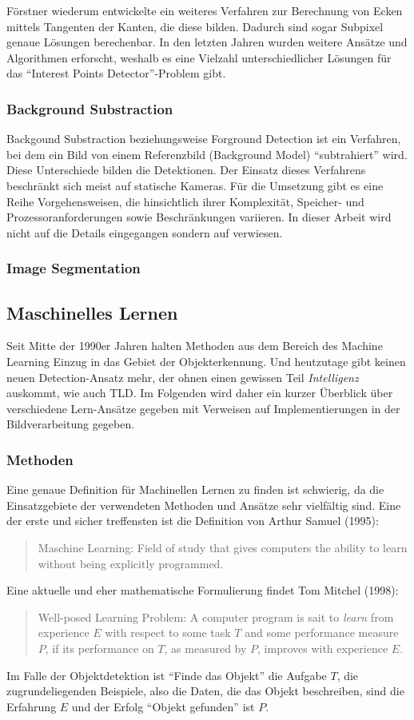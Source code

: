 Förstner \cite{FOD} wiederum entwickelte ein weiteres Verfahren zur Berechnung von Ecken mittels Tangenten der Kanten, die diese bilden. Dadurch sind sogar Subpixel genaue Lösungen berechenbar. In den letzten Jahren wurden weitere Ansätze und Algorithmen erforscht, weshalb es eine Vielzahl unterschiedlicher Lösungen für das ``Interest Points Detector''-Problem gibt.

\subsubsection{Background Substraction}
Backgound Substraction beziehungsweise Forground Detection ist ein Verfahren, bei dem ein Bild von einem Referenzbild (Background Model) ``subtrahiert'' wird. Diese Unterschiede bilden die Detektionen. Der Einsatz dieses Verfahrens beschränkt sich meist auf statische Kameras. Für die Umsetzung gibt es eine Reihe Vorgehensweisen, die hinsichtlich ihrer Komplexität, Speicher- und Prozessoranforderungen sowie Beschränkungen variieren. In dieser Arbeit wird nicht auf die Details eingegangen sondern auf \cite{BAG} verwiesen.

\subsubsection{Image Segmentation}


\subsection{Maschinelles Lernen}
Seit Mitte der 1990er Jahren halten Methoden aus dem Bereich des Machine Learning Einzug in das Gebiet der Objekterkennung. Und heutzutage gibt keinen neuen Detection-Ansatz mehr, der ohnen einen gewissen Teil \textit{Intelligenz} auskommt, wie auch TLD. Im Folgenden wird daher ein kurzer Überblick über verschiedene Lern-Ansätze gegeben mit Verweisen auf Implementierungen in der Bildverarbeitung gegeben.

\subsubsection{Methoden}
Eine genaue Definition für Machinellen Lernen zu finden ist schwierig, da die Einsatzgebiete der verwendeten Methoden und Ansätze sehr vielfältig sind. Eine der erste und sicher treffensten ist die Definition von Arthur Samuel (1995):
\begin{quote}
Maschine Learning: Field of study that gives computers the ability to learn without being explicitly programmed. 
\end{quote}
Eine aktuelle und eher mathematische Formulierung findet Tom Mitchel (1998):
\begin{quote}
Well-posed Learning Problem: A computer program is sait to \textit{learn} from experience $E$ with respect to some task $T$ and some performance measure $P$, if its performance on $T$, as measured by $P$, improves with experience $E$.
\end{quote}
Im Falle der Objektdetektion ist ``Finde das Objekt'' die Aufgabe $T$, die zugrundeliegenden Beispiele, also die Daten, die das Objekt beschreiben, sind die Erfahrung $E$ und der Erfolg ``Objekt gefunden'' ist $P$.

